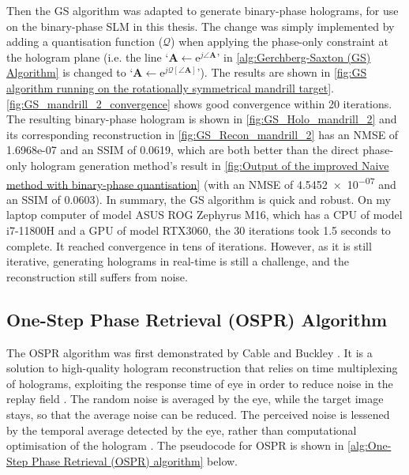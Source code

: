 Then the GS algorithm was adapted to generate binary-phase holograms, for use on the binary-phase SLM in this thesis. The change was simply implemented by adding a quantisation function ($\mathcal{Q}$) when applying the phase-only constraint at the hologram plane (i.e. the line `$\textbf{A} \gets \mathrm{e}^{j\angle \textbf{A}}$' in \cref{alg:Gerchberg-Saxton (GS) Algorithm} is changed to `$\textbf{A} \gets \mathrm{e}^{j\mathcal{Q}[\angle \textbf{A}]}$'). The results are shown in \cref{fig:GS algorithm running on the rotationally symmetrical mandrill target}. \cref{fig:GS_mandrill_2_convergence} shows good convergence within 20 iterations. The resulting binary-phase hologram is shown in \cref{fig:GS_Holo_mandrill_2} and its corresponding reconstruction in \cref{fig:GS_Recon_mandrill_2} has an NMSE of 1.6968e-07 and an SSIM of 0.0619, which are both better than the direct phase-only hologram generation method's result in \cref{fig:Output of the improved Naive method with binary-phase quantisation} (with an NMSE of \num{4.5452e-07} and an SSIM of 0.0603). In summary, the GS algorithm is quick and robust. On my laptop computer of model ASUS ROG Zephyrus M16, which has a CPU of model i7-11800H and a GPU of model RTX3060, the 30 iterations took 1.5 seconds to complete. It reached convergence in tens of iterations. However, as it is still iterative, generating holograms in real-time is still a challenge, and the reconstruction still suffers from noise.


\subsection{One-Step Phase Retrieval (OSPR) Algorithm}\label{sec:One Step Phase Retrieval (OSPR) Algorithm}
The OSPR algorithm was first demonstrated by Cable and Buckley \cite{Cable2004}. It is a solution to high-quality hologram reconstruction that relies on time multiplexing of holograms, exploiting the response time of eye in order to reduce noise in the replay field \cite{Cable2006}. The random noise is averaged by the eye, while the target image stays, so that the average noise can be reduced. The perceived noise is lessened by the temporal average detected by the eye, rather than computational optimisation of the hologram \cite{Cable2006}. The pseudocode for OSPR is shown in \cref{alg:One-Step Phase Retrieval (OSPR) algorithm} below.

